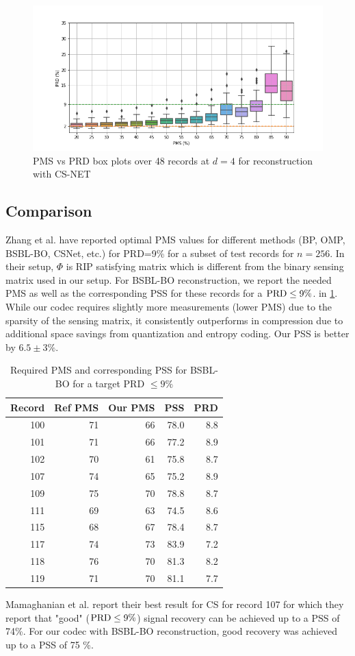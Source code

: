 \begin{figure}
\centering
\includegraphics[width=0.95\linewidth]{images/csnet/pms-vs-prd-boxplot.png}
\caption{PMS vs PRD box plots over 48 records at $d=4$ for reconstruction
with CS-NET}
\label{fig-res-csnet-pms-prd-boxplot}
\end{figure}


\subsection{Comparison}
Zhang et al. \cite{zhang2021csnet} have reported
optimal PMS values for different methods (BP, OMP, BSBL-BO, CSNet, etc.)
for PRD=9\% for a subset of test records for $n=256$.
In their setup, $\Phi$ is RIP satisfying matrix which is different
from the binary sensing matrix used in our setup.
For BSBL-BO reconstruction,
we report the needed PMS as well as the corresponding PSS
for these records for a $\mathrm{PRD} \leq 9 \%$.
in \cref{tbl-bsbl-optimal-pss-prd}.
While our codec requires slightly more measurements (lower PMS)
due to the sparsity of the sensing matrix, it consistently
outperforms in compression due to additional space
savings from quantization and entropy coding.
Our PSS is better by $6.5 \pm 3\%$. 

\begin{table}[ht]
\centering
\caption{Required PMS and corresponding PSS for BSBL-BO for
a target PRD $\leq 9\%$}
\begin{tabular}{rrrrr}
\toprule
 Record &  Ref PMS &  Our PMS &  PSS &  PRD \\
\midrule
100 &         71 &   66 & 78.0 &  8.8 \\
101 &         71 &   66 & 77.2 &  8.9 \\
102 &         70 &   61 & 75.8 &  8.7 \\
107 &         74 &   65 & 75.2 &  8.9 \\
109 &         75 &   70 & 78.8 &  8.7 \\
111 &         69 &   63 & 74.5 &  8.6 \\
115 &         68 &   67 & 78.4 &  8.7 \\
117 &         74 &   73 & 83.9 &  7.2 \\
118 &         76 &   70 & 81.3 &  8.2 \\
119 &         71 &   70 & 81.1 &  7.7 \\
\bottomrule
\end{tabular}
\label{tbl-bsbl-optimal-pss-prd}
\end{table}


Mamaghanian et al. \cite{mamaghanian2011compressed}
report their best result for CS for record 107
for which they report that "good" ($\mathrm{PRD} \leq 9\%$)
signal recovery can be achieved up to a PSS of 74\%.
For our codec with BSBL-BO reconstruction, good
recovery was achieved up to a PSS of 75 \%.
